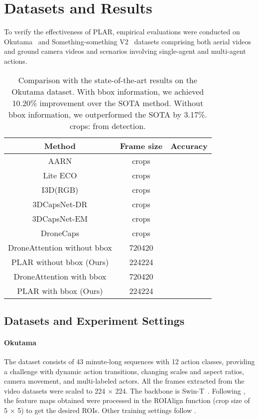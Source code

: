 \documentclass[letterpaper, 10 pt, conference]{ieeeconf}
\begin{document}
 \section{Datasets and Results}
To verify the effectiveness of PLAR, empirical evaluations were conducted on Okutama~\cite{barekatain2017okutama} and Something-something V2~\cite{goyal2017something} datasets comprising both aerial videos and ground camera videos and scenarios involving single-agent and multi-agent actions.

\begin{table}[t]
\centering
\begin{tabular}{c c c }
\toprule
Method & Frame size  & Accuracy    \\
\midrule
AARN \cite{yang2019framework, algamdi2020dronecaps} & crops  & \\
Lite ECO \cite{zolfaghari2018eco, algamdi2020dronecaps} & crops  & \\
I3D(RGB)\cite{carreira2017quo, algamdi2020dronecaps} &  crops & \\
3DCapsNet-DR\cite{zhang2020capsnets, algamdi2020dronecaps} & crops  & \\
3DCapsNet-EM\cite{zhang2020capsnets, algamdi2020dronecaps} & crops  & \\
DroneCaps\cite{algamdi2020dronecaps} & crops  & \\
DroneAttention without bbox\cite{yadav2023droneattention} & 720420 &   \\
PLAR without bbox (Ours) & 224224 &   \\
\midrule
DroneAttention with bbox \cite{yadav2023droneattention} & 720420&   \\
PLAR with bbox (Ours) & 224224 &   \\
\bottomrule
\end{tabular}
\caption{Comparison with the state-of-the-art results on the Okutama dataset. With bbox information, we achieved 10.20\% improvement over the SOTA method. Without bbox information, we outperformed the SOTA by 3.17\%. crops: from detection.}
\label{tab:okutama}
\end{table} \subsection{Datasets and Experiment Settings}
\paragraph{Okutama~\cite{barekatain2017okutama}} The dataset consists of 43 minute-long sequences with 12 action classes, providing a challenge with dynamic action transitions, changing scales and aspect ratios, camera movement, and multi-labeled actors. All the frames extracted from the video datasets were scaled to 224 × 224. The backbone is Swin-T~\cite{liu2021swin}. Following \cite{yadav2023droneattention}, the feature maps obtained were processed in the ROIAlign function (crop size of 5 × 5) to get the desired ROIs. Other training settings follow \cite{liu2021swin}.
\end{document}
